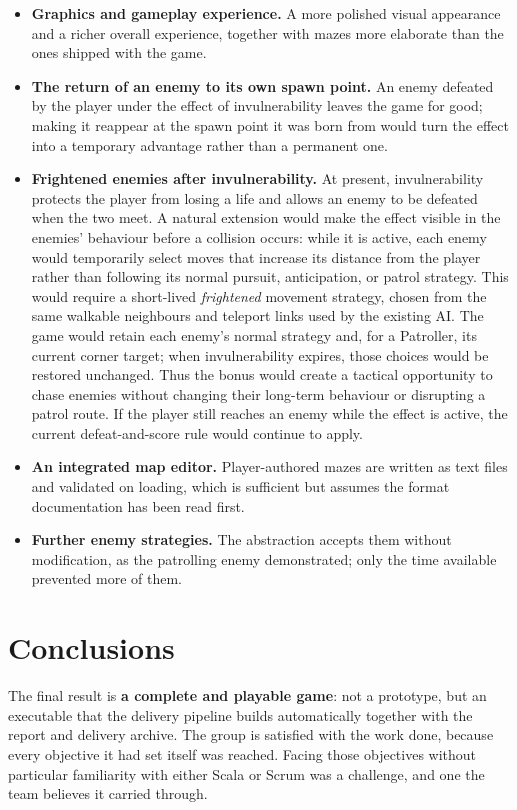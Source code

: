 \begin{itemize}
  \item \textbf{Graphics and gameplay experience.} A more polished visual appearance and a richer overall experience,
  together with mazes more elaborate than the ones shipped with the game.
  \item \textbf{The return of an enemy to its own spawn point.} An enemy defeated by the player under the effect of
  invulnerability leaves the game for good; making it reappear at the spawn point it was born from would turn the
  effect into a temporary advantage rather than a permanent one.
  \item \textbf{Frightened enemies after invulnerability.} At present, invulnerability protects the player from losing
  a life and allows an enemy to be defeated when the two meet. A natural extension would make the effect visible in the
  enemies' behaviour before a collision occurs: while it is active, each enemy would temporarily select moves that
  increase its distance from the player rather than following its normal pursuit, anticipation, or patrol strategy.
  This would require a short-lived \emph{frightened} movement strategy, chosen from the same walkable neighbours and
  teleport links used by the existing AI. The game would retain each enemy's normal strategy and, for a Patroller, its
  current corner target; when invulnerability expires, those choices would be restored unchanged. Thus the bonus would
  create a tactical opportunity to chase enemies without changing their long-term behaviour or disrupting a patrol
  route. If the player still reaches an enemy while the effect is active, the current defeat-and-score rule would
  continue to apply.
  \item \textbf{An integrated map editor.} Player-authored mazes are written as text files and validated on loading,
  which is sufficient but assumes the format documentation has been read first.
  \item \textbf{Further enemy strategies.} The abstraction accepts them without modification, as the patrolling enemy
  demonstrated; only the time available prevented more of them.
\end{itemize}

\section{Conclusions}

The final result is \textbf{a complete and playable game}: not a prototype, but an executable that the delivery
pipeline builds automatically together with the report and delivery archive. The group is satisfied with the work done,
because every objective it had set itself was reached. Facing those objectives without
particular familiarity with either Scala or Scrum was a challenge, and one the team believes it carried through.

